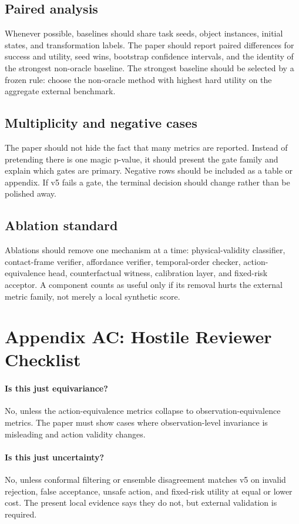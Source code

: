 \documentclass{article}
\begin{document}
\subsection{Paired analysis}
Whenever possible, baselines should share task seeds, object instances, initial states, and transformation labels. The paper should report paired differences for success and utility, seed wins, bootstrap confidence intervals, and the identity of the strongest non-oracle baseline. The strongest baseline should be selected by a frozen rule: choose the non-oracle method with highest hard utility on the aggregate external benchmark.

\subsection{Multiplicity and negative cases}
The paper should not hide the fact that many metrics are reported. Instead of pretending there is one magic p-value, it should present the gate family and explain which gates are primary. Negative rows should be included as a table or appendix. If v5 fails a gate, the terminal decision should change rather than be polished away.

\subsection{Ablation standard}
Ablations should remove one mechanism at a time: physical-validity classifier, contact-frame verifier, affordance verifier, temporal-order checker, action-equivalence head, counterfactual witness, calibration layer, and fixed-risk acceptor. A component counts as useful only if its removal hurts the external metric family, not merely a local synthetic score.


\section{Appendix AC: Hostile Reviewer Checklist}
\paragraph{Is this just equivariance?} No, unless the action-equivalence metrics collapse to observation-equivalence metrics. The paper must show cases where observation-level invariance is misleading and action validity changes.

\paragraph{Is this just uncertainty?} No, unless conformal filtering or ensemble disagreement matches v5 on invalid rejection, false acceptance, unsafe action, and fixed-risk utility at equal or lower cost. The present local evidence says they do not, but external validation is required.
\end{document}

